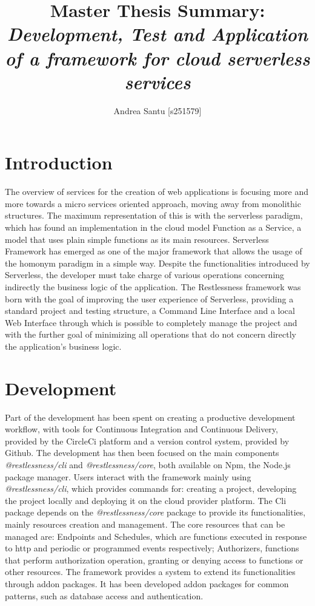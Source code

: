 \documentclass{article}
\begin{document}
\title{Master Thesis Summary: \textit{Development, Test and Application of a framework for cloud serverless services}}

\author{Andrea Santu [s251579]}

\maketitle

\section{Introduction}
The overview of services for the creation of web applications is focusing more
and more towards a micro services oriented approach, moving away from monolithic
structures.
The maximum representation of this is with the serverless paradigm, which has
found an implementation in the cloud model Function as a Service, a model that
uses plain simple functions as its main resources.
Serverless Framework has emerged as one of the major framework that allows the
usage of the homonym paradigm in a simple way.
Despite the functionalities introduced by Serverless, the developer must take
charge of various operations concerning indirectly the business logic of the
application.
The Restlessness framework was born with the goal of improving the user experience
of Serverless, providing a standard project and testing structure, a Command Line
Interface and a local Web Interface through which is possible to completely manage
the project and with the further goal of minimizing all operations that do not
concern directly the application's business logic.

\section{Development}
Part of the development has been spent on creating a productive development
workflow, with tools for Continuous Integration and Continuous Delivery, provided
by the CircleCi platform and a version control system, provided by Github.
The development has then been focused on the main components
\mbox{\textit{@restlessness/cli}} and \mbox{\textit{@restlessness/core}}, both
available on Npm, the Node.js package manager.
Users interact with the framework mainly using \mbox{\textit{@restlessness/cli}},
which provides commands for: creating a project, developing the project locally
and deploying it on the cloud provider platform.
The Cli package depends on the \mbox{\textit{@restlessness/core}} package to provide
its functionalities, mainly resources creation and management. The core resources
that can be managed are: Endpoints and Schedules, which are functions executed in
response to http and periodic or programmed events respectively; Authorizers,
functions that perform authorization operation, granting or denying access to
functions or other resources.
The framework provides a system to extend its functionalities through addon packages.
It has been developed addon packages for common patterns, such as database access
and authentication.
\end{document}
